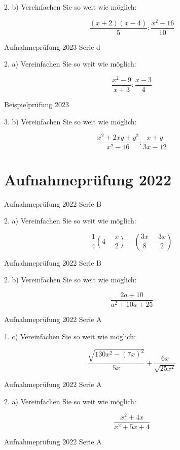 2. b) Vereinfachen Sie so weit wie möglich:

$$\frac{(x+2)(x-4)}{5} : \frac{x^2 - 16}{10}$$

Aufnahmeprüfung 2023 Serie d

2. a) Vereinfachen Sie so weit wie möglich:

$$\frac{x^2-9}{x+3} : \frac{x-3}{4}$$

Beispielprüfung 2023

3. b) Vereinfachen Sie so weit wie möglich:

$$\frac{x^2+2xy+y^2}{x^2-16} : \frac{x+y}{3x-12}$$

\section*{Aufnahmeprüfung 2022}
Aufnahmeprüfung 2022 Serie B

2. a) Vereinfachen Sie so weit wie möglich:

$$\frac14 \left(4-\frac{x}2 \right) - \left( \frac{3x}{8} - \frac{3x}{2}\right)$$

Aufnahmeprüfung 2022 Serie B

2. b) Vereinfachen Sie so weit wie möglich:

$$\frac{2a+10}{a^2+10a+25}$$

Aufnahmeprüfung 2022 Serie A

1. c) Vereinfachen Sie so weit wie möglich:

$$\frac{\sqrt{130x^2-(7x)^2}}{5x} + \frac{6x}{\sqrt{25x^2}}$$

Aufnahmeprüfung 2022 Serie A

2. a) Vereinfachen Sie so weit wie möglich:

$$\frac{x^2+4x}{x^2+5x+4}$$

Aufnahmeprüfung 2022 Serie A

